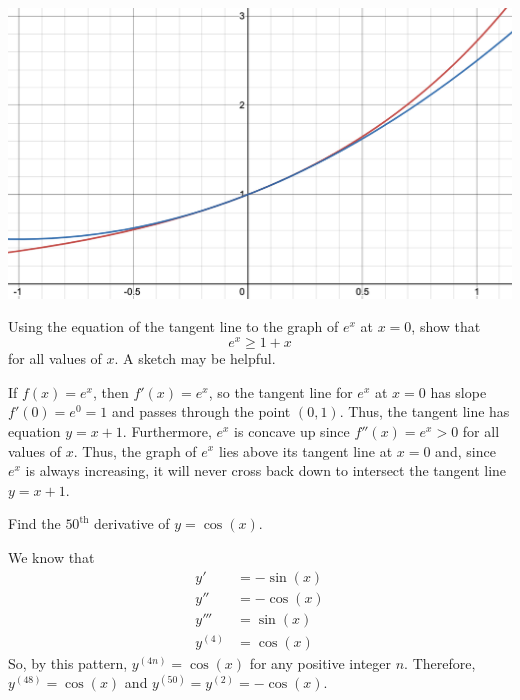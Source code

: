 \documentclass[11pt]{exam}
\begin{document}
\begin{questions}
\begin{solution}
      \begin{center}
        \includegraphics[scale=0.4]{ex_vs_approx}
      \end{center}
    \end{solution}
    \vspace{1em}
  \question Using the equation of the tangent line to the graph of $e^x$ at $x=0$, show that $$e^x\geq 1+x$$ for all values of $x$.  A sketch may be helpful.
    \begin{solution}
      If \(f(x) = e^x\), then \(f'(x) = e^x\), so the tangent line for
      \(e^x\) at \(x=0\) has slope \(f'(0) = e^0 = 1\) and passes
      through the point \((0,1)\). Thus, the tangent line has equation
      \(y = x+1\). Furthermore, \(e^x\) is concave up since \(f''(x) =
      e^x > 0\) for all values of \(x\). Thus, the graph of \(e^x\)
      lies above its tangent line at \(x=0\) and, since \(e^x\) is
      always increasing, it will never cross back down to intersect
      the tangent line \(y=x+1\).
    \end{solution}
    \vspace{1em}
  \question Find the $50^{\text{th}}$ derivative of $y = \cos(x)$.
    \begin{solution}
      We know that
      \begin{align*}
        y' & = -\sin(x)\\
        y'' & = -\cos(x)\\
        y''' & = \sin(x)\\
        y^{(4)} & = \cos(x)
      \end{align*}
      So, by this pattern, \(y^{(4n)} = \cos(x)\) for any positive
      integer \(n\). Therefore, \(y^{(48)} = \cos(x)\) and \(y^{(50)}
      = y^{(2)} = -\cos(x)\).
    \end{solution}
    \vspace{1em}

\end{questions}
\end{document}

